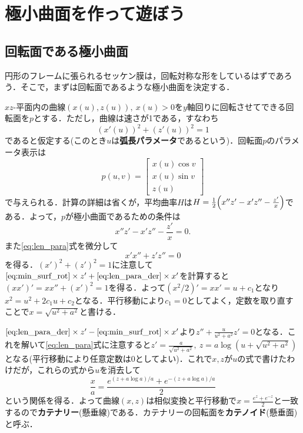 \documentclass[a4j]{ltjsarticle}
\numberwithin{equation}{section}
\theoremstyle{definition}
\begin{document}
\section{極小曲面を作って遊ぼう}
\subsection{回転面である極小曲面}
円形のフレームに張られるセッケン膜は，回転対称な形をしているはずであろう．そこで，まずは回転面であるような極小曲面を決定する．

$xz$-平面内の曲線$(x(u),z(u)),\ x(u)>0$を$y$軸回りに回転させてできる回転面を$p$とする．ただし，曲線は速さが1である，すなわち
\begin{equation}
    (x'(u))^2+(z'(u))^2=1\label{eq:len_para}
\end{equation}
であると仮定する(このとき$u$は\textbf{弧長パラメータ}であるという)．回転面$p$のパラメータ表示は
\begin{equation}
    p(u,v)=\begin{bmatrix}
        x(u)\cos v\\
        x(u)\sin v\\
        z(u) 
    \end{bmatrix}
\end{equation}
で与えられる．計算の詳細は省くが，平均曲率$H$は$H=\frac{1}{2}\qty(x''z'-x'z''-\frac{z'}{x})$である．よって，$p$が極小曲面であるための条件は
\begin{equation}
    x''z'-x'z''-\frac{z'}{x}=0.\label{eq:min_surf_rot}
\end{equation}
また\eqref{eq:len_para}式を微分して
\begin{equation}
    x'x''+z'z''=0\label{eq:len_para_der}
\end{equation}
を得る．$(x')^2+(z')^2=1$に注意して$\text{\eqref{eq:min_surf_rot}}\times z'+\text{\eqref{eq:len_para_der}}\times x'$を計算すると$(xx')'=xx''+(x')^2=1$を得る．よって$(x^2/2)'=xx'=u+c_1$となり$x^2=u^2+2c_1u+c_2$となる．平行移動により$c_1=0$としてよく，定数を取り直すことで$x=\sqrt{u^2+a^2}$と書ける．

$\text{\eqref{eq:len_para_der}}\times z'-\text{\eqref{eq:min_surf_rot}}\times x'$より$z''+\frac{u}{u^2+a^2}z'=0$となる．これを解いて\eqref{eq:len_para}式に注意すると$z'=\frac{a}{\sqrt{u^2+a^2}},\ z=a\log(u+\sqrt{u^2+a^2})$となる(平行移動により任意定数は0としてよい)．これで$x,z$が$u$の式で書けたわけだが，これらの式から$u$を消去して
\begin{equation}
    \frac{x}{a}=\frac{e^{(z+a\log a)/a}+e^{-(z+a\log a)/a}}{2}
\end{equation}
という関係を得る．よって曲線$(x,z)$は相似変換と平行移動で$x=\frac{e^z+e^{-z}}{2}$と一致するので\textbf{カテナリー}(懸垂線)である．カテナリーの回転面を\textbf{カテノイド}(懸垂面)と呼ぶ．
\end{document}
